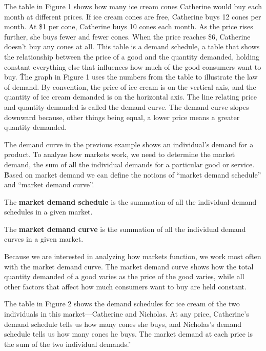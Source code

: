 The table in Figure 1 shows how many ice cream cones Catherine would buy each month at different prices. If ice cream
cones are free, Catherine buys 12 cones per month. At \$1 per cone, Catherine buys 10 cones each month. As the price
rises further, she buys fewer and fewer cones. When the price reaches \$6, Catherine doesn't buy any cones at all.
This table is a demand schedule, a table that shows the relationship between the price of a good and the quantity
demanded, holding constant everything else that influences how much of the good consumers want to buy. \v

The graph in Figure 1 uses the numbers from the table to illustrate the law of demand. By convention, the price of
ice cream is on the vertical axis, and the quantity of ice cream demanded is on the horizontal axis. The line
relating price and quantity demanded is called the demand curve. The demand curve slopes downward because, other
things being equal, a lower price means a greater quantity demanded.
\ee

The demand curve in the previous example shows an individual's demand for a product. To analyze how markets work, we
need to determine the market demand, the sum of all the individual demands for a particular good or service. \v

Based on market demand we can define the notions of ``market demand schedule'' and ``market demand curve''.

The \textbf{market demand schedule} is the summation of all the individual demand schedules in a given market.
\ed

The \textbf{market demand curve} is the summation of all the individual demand curves in a given market.
\ed

Because we are interested in analyzing how markets function, we work most often with the market demand curve. The
market demand curve shows how the total quantity demanded of a good varies as the price of the good varies, while all
other factors that affect how much consumers want to buy are held constant.

\be
{}

The table in Figure 2 shows the demand schedules for ice cream of the two individuals in this market—Catherine and
Nicholas. At any price, Catherine's demand schedule tells us how many cones she buys, and Nicholas's demand schedule
tells us how many cones he buys. The market demand at each price is the sum of the two individual demands. \v

